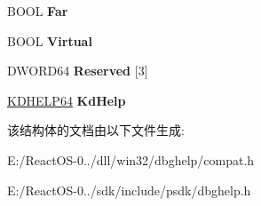 \begin{DoxyCompactItemize}
\item 
\mbox{\label{struct___s_t_a_c_k_f_r_a_m_e64_ad92c688f5f6f9d4db1100290720360e3}} 
B\+O\+OL {\bfseries Far}
\item 
\mbox{\label{struct___s_t_a_c_k_f_r_a_m_e64_af8603bb7eeab2aa26bd25fdc10ac984c}} 
B\+O\+OL {\bfseries Virtual}
\item 
\mbox{\label{struct___s_t_a_c_k_f_r_a_m_e64_a99dafcf4ac29e38d6803b2845865ce5f}} 
D\+W\+O\+R\+D64 {\bfseries Reserved} \mbox{[}3\mbox{]}
\item 
\mbox{\label{struct___s_t_a_c_k_f_r_a_m_e64_a58018c8453fa87d1210b5f7eb1989825}} 
\hyperlink{struct___k_d_h_e_l_p64}{K\+D\+H\+E\+L\+P64} {\bfseries Kd\+Help}
\end{DoxyCompactItemize}


该结构体的文档由以下文件生成\+:\begin{DoxyCompactItemize}
\item 
E\+:/\+React\+O\+S-\/0../dll/win32/dbghelp/compat.\+h\item 
E\+:/\+React\+O\+S-\/0../sdk/include/psdk/dbghelp.\+h\end{DoxyCompactItemize}
